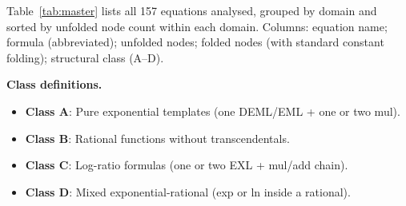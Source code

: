 \documentclass[12pt,a4paper]{article}
\theoremstyle{definition}
\begin{document}
Table~\ref{tab:master} lists all 157 equations analysed, grouped by domain
and sorted by unfolded node count within each domain.
Columns: equation name; formula (abbreviated); unfolded nodes; folded nodes
(with standard constant folding); structural class (A--D).

\textbf{Class definitions.}
\begin{itemize}[noitemsep]
\item \textbf{Class A}: Pure exponential templates (one DEML/EML + one or two mul).
\item \textbf{Class B}: Rational functions without transcendentals.
\item \textbf{Class C}: Log-ratio formulas (one or two EXL + mul/add chain).
\item \textbf{Class D}: Mixed exponential-rational (exp or ln inside a rational).
\end{itemize}
\end{document}
